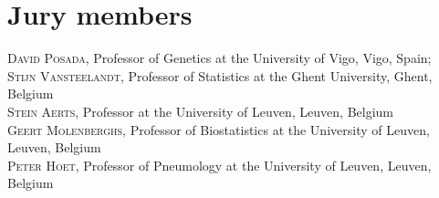 
\chapter*{Jury members}


\noindent \textsc{David Posada}, Professor of Genetics at the University of Vigo, Vigo, Spain; \\

\noindent \textsc{Stijn Vansteelandt}, Professor of Statistics at the Ghent University, Ghent, Belgium \\

\noindent \textsc{Stein Aerts}, Professor at the University of Leuven, Leuven, Belgium \\

\noindent \textsc{Geert Molenberghs}, Professor of Biostatistics at the University of Leuven, Leuven, Belgium \\

\noindent \textsc{Peter Hoet}, Professor of Pneumology at the University of Leuven, Leuven, Belgium \\


